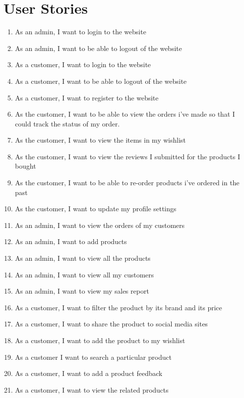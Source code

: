 \documentclass{report}
\begin{document}
\section{User Stories}
\begin{enumerate}
\item As an admin, I want to login to the website
\item As an admin, I want to be able to logout of the website
\item As a customer, I want to login to the website
\item As a customer, I want to be able to logout of the website
\item As a customer, I want to register to the website
\item As the customer, I want to be able to view the orders i've made so that I could track the status of my order. 
\item As the customer, I want to view the items in my wishlist
\item As the customer, I want to view the reviews I submitted for the products I bought
\item As the customer, I want to be able to re-order products i've ordered in the past
\item As the customer, I want to update my profile settings
\item As an admin, I want to view the orders of my customers
\item As an admin, I want to add products
\item As an admin, I want to view all the products
\item As an admin, I want to view all my customers
\item As an admin, I want to view my sales report
\item As a customer, I want to filter the product by its brand and its price
\item As a customer, I want to share the product to social media sites
\item As a customer, I want to add the product to my wishlist
\item As a customer I want to search a particular product 
\item As a customer, I want to add a product feedback
\item As a customer, I want to view the related products
\end{enumerate}
\end{document}
